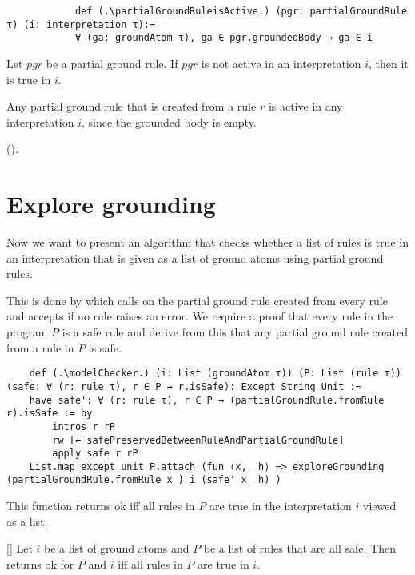         \begin{lstlisting}
            def (.\partialGroundRuleisActive.) (pgr: partialGroundRule τ) (i: interpretation τ):=
            ∀ (ga: groundAtom τ), ga ∈ pgr.groundedBody → ga ∈ i 
        \end{lstlisting}

        \begin{lemma}[\notActiveRuleIsTrue]
            Let $pgr$ be a partial ground rule. If $pgr$ is not active in an interpretation $i$, then it is true in $i$.
        \end{lemma}

        Any partial ground rule that is created from a rule $r$ is active in any interpretation $i$, since the grounded body is empty.
        
        (\partialGroundRulefromRuleIsActive).

    \section{Explore grounding}

    Now we want to present an algorithm that checks whether a list of rules is true in an interpretation that is given as a list of ground atoms using partial ground rules.
    
    This is done by \modelChecker which calls \exploreGrounding on the partial ground rule created from every rule and accepts if no rule raises an error. We require a proof that every rule in the program $P$ is a safe rule and derive from this that any partial ground rule created from a rule in $P$ is safe.

    \begin{lstlisting}
    def (.\modelChecker.) (i: List (groundAtom τ)) (P: List (rule τ)) (safe: ∀ (r: rule τ), r ∈ P → r.isSafe): Except String Unit :=
    have safe': ∀ (r: rule τ), r ∈ P → (partialGroundRule.fromRule r).isSafe := by
        intros r rP
        rw [← safePreservedBetweenRuleAndPartialGroundRule]
        apply safe r rP
    List.map_except_unit P.attach (fun ⟨x, _h⟩ => exploreGrounding (partialGroundRule.fromRule x ) i (safe' x _h) )
    \end{lstlisting}
    
    This function returns ok iff all rules in $P$ are true in the interpretation $i$ viewed as a list.

    \begin{theorem}\label{trm:modelChecker}[\modelCheckerUnitIffAllRulesTrue]
        Let $i$ be a list of ground atoms and $P$ be a list of rules that are all safe. Then \modelChecker returns ok for $P$ and $i$ iff all rules in $P$ are true in $i$.
    \end{theorem}

